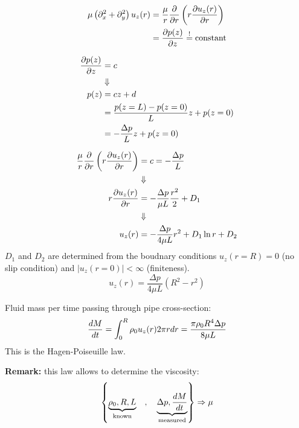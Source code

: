 \begin{align}
\mu\left(\partial_x^2+\partial_y^2\right) u_z(r) &= \frac{\mu}{r}\frac{\partial }{\partial r}\left(r\frac{\partial u_z(r)}{\partial r}\right) \\
&= \frac{\partial p(z)}{\partial z} \overset{!}{=} \mathrm{constant}
\end{align}

\begin{align}
\frac{\partial p(z)}{\partial z}&=c \\
&\Downarrow\notag\\
p(z) &= cz+d \\
&= \frac{p(z=L)-p(z=0)}{L}z+p(z=0)\\
&= -\frac{\Delta p}{L}z + p(z=0)
\end{align}

\begin{align}
\frac{\mu}{r}\frac{\partial }{\partial r}\left(r\frac{\partial u_z(r)}{\partial r}\right) &= c = -\frac{\Delta p}{L} \\
&\Downarrow\notag\\
r\frac{\partial u_z(r)}{\partial r} &= -\frac{\Delta p}{\mu L}\frac{r^2}{2} + D_1 \\
&\Downarrow\notag\\
u_z(r) &= -\frac{\Delta p}{4\mu L}r^2 + D_1 \ln r + D_ 2 \\
\end{align}
$D_1$ and $D_2$ are determined from the boudnary conditions $u_z(r=R)=0$ (no slip condition) and $|u_z(r=0)|<\infty$ (finiteness).
\begin{equation}
u_z(r) = \frac{\Delta p}{4\mu L}\left( R^2 - r^2\right)
\end{equation}

Fluid mass per time passing through pipe cross-section:
\begin{equation}
\frac{d M}{d t} = \int_0^R\rho_0 u_z(r)2\pi r dr = \frac{\pi\rho_0 R^4\Delta p}{8\mu L}
\end{equation}
This is the Hagen-Poiseuille law.
\begin{framed}
\textbf{Remark:} this law allows to determine the viscosity:
\begin{equation}
\left\lbrace \underbrace{\rho_0,R,L}_\mathrm{known} \quad,\quad \underbrace{\Delta p,\frac{d M}{d t}}_\mathrm{measured} \right\rbrace \Rightarrow \mu
\end{equation}
\end{framed}

